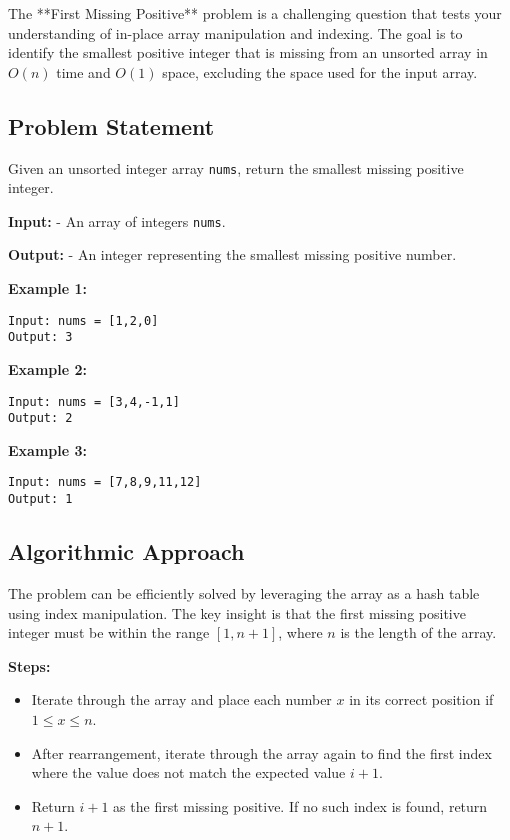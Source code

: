 
\label{problem:First_Missing_Positive}

The **First Missing Positive** problem is a challenging question that tests your understanding of in-place array manipulation and indexing. The goal is to identify the smallest positive integer that is missing from an unsorted array in \(O(n)\) time and \(O(1)\) space, excluding the space used for the input array.

\subsection*{Problem Statement}
Given an unsorted integer array \texttt{nums}, return the smallest missing positive integer.

\textbf{Input:}
- An array of integers \texttt{nums}.

\textbf{Output:}
- An integer representing the smallest missing positive number.

\textbf{Example 1:}
\begin{verbatim}
Input: nums = [1,2,0]
Output: 3
\end{verbatim}

\textbf{Example 2:}
\begin{verbatim}
Input: nums = [3,4,-1,1]
Output: 2
\end{verbatim}

\textbf{Example 3:}
\begin{verbatim}
Input: nums = [7,8,9,11,12]
Output: 1
\end{verbatim}

\subsection*{Algorithmic Approach}
The problem can be efficiently solved by leveraging the array as a hash table using index manipulation. The key insight is that the first missing positive integer must be within the range \([1, n+1]\), where \(n\) is the length of the array.

\textbf{Steps:}
\begin{itemize}
    \item Iterate through the array and place each number \(x\) in its correct position if \(1 \leq x \leq n\).
    \item After rearrangement, iterate through the array again to find the first index where the value does not match the expected value \(i+1\).
    \item Return \(i+1\) as the first missing positive. If no such index is found, return \(n+1\).
\end{itemize}

